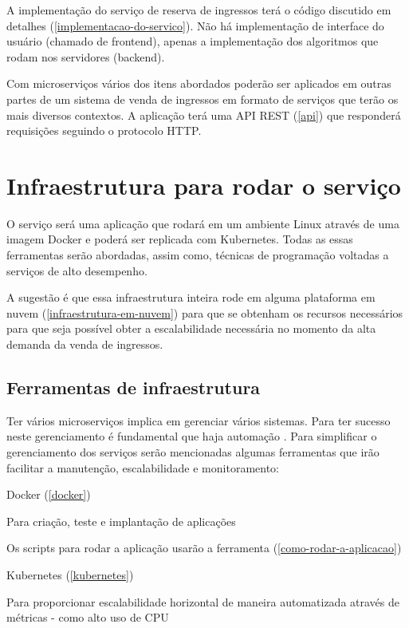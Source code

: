 A implementação do serviço de reserva de ingressos terá o código discutido
em detalhes (\autoref{implementacao-do-servico}). Não há implementação
de interface do usuário (chamado de frontend), apenas a implementação dos algoritmos
que rodam nos servidores (backend).

Com microserviços vários dos itens abordados poderão ser aplicados em outras partes
de um sistema
de venda de ingressos em formato de serviços que terão os mais diversos contextos.
A aplicação terá uma API REST (\autoref{api}) que responderá requisições
seguindo o protocolo HTTP.

\section{Infraestrutura para rodar o serviço}

O serviço será uma aplicação que rodará em um ambiente Linux através
de uma imagem Docker e poderá ser replicada com Kubernetes.
Todas as essas ferramentas serão abordadas, assim como, técnicas de programação
voltadas a serviços de alto desempenho.

A sugestão é que essa infraestrutura inteira rode em alguma plataforma em nuvem
(\autoref{infraestrutura-em-nuvem}) para que se obtenham os recursos necessários para que
seja possível obter a escalabilidade necessária no momento da alta demanda da
venda de ingressos.

\subsection{Ferramentas de infraestrutura}

Ter vários microserviços implica em gerenciar
vários sistemas.
Para ter sucesso neste gerenciamento é fundamental que haja automação
\cite{martin-fowler-microservices}.
Para simplificar o gerenciamento dos serviços serão mencionadas algumas ferramentas que
irão facilitar a manutenção, escalabilidade e monitoramento:

\begin{alineas}

  \item Docker (\autoref{docker})

  \begin{alineas}
     \item Para criação, teste e implantação de aplicações \cite{aws-o-que-e-o-docker}
     \item Os scripts para rodar a aplicação usarão a ferramenta
           (\autoref{como-rodar-a-aplicacao})
  \end{alineas}

  \item Kubernetes (\autoref{kubernetes})

  \begin{alineas}
     \item Para proporcionar escalabilidade horizontal de maneira automatizada através de métricas
           - como alto uso de CPU \cite{kubernetes-horizontal-pod-autoscaling}
  \end{alineas}

\end{alineas}
